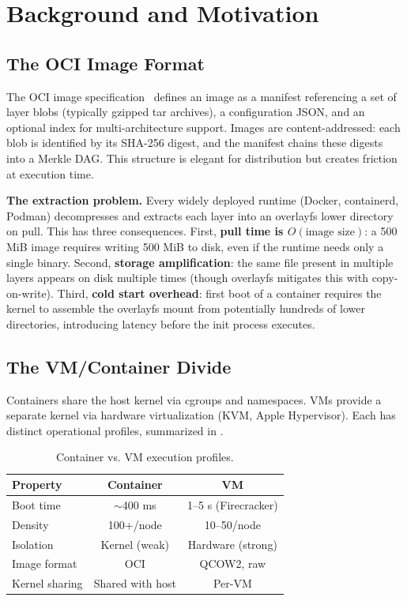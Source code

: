 \documentclass[11pt,a4paper]{article}
\begin{document}
\section{Background and Motivation}\label{sec:background}

\subsection{The OCI Image Format}

The OCI image specification~\cite{oci-spec} defines an image as a manifest referencing a set of layer blobs (typically gzipped tar archives), a configuration JSON, and an optional index for multi-architecture support. Images are content-addressed: each blob is identified by its SHA-256 digest, and the manifest chains these digests into a Merkle DAG. This structure is elegant for distribution but creates friction at execution time.

\textbf{The extraction problem.} Every widely deployed runtime (Docker, containerd, Podman) decompresses and extracts each layer into an overlayfs lower directory on pull. This has three consequences. First, \textbf{pull time is $O(\text{image size})$}: a 500 MiB image requires writing 500 MiB to disk, even if the runtime needs only a single binary. Second, \textbf{storage amplification}: the same file present in multiple layers appears on disk multiple times (though overlayfs mitigates this with copy-on-write). Third, \textbf{cold start overhead}: first boot of a container requires the kernel to assemble the overlayfs mount from potentially hundreds of lower directories, introducing latency before the init process executes.

\subsection{The VM/Container Divide}

Containers share the host kernel via cgroups and namespaces. VMs provide a separate kernel via hardware virtualization (KVM, Apple Hypervisor). Each has distinct operational profiles, summarized in .

\begin{table}[htbp]
    \centering
    \caption{Container vs. VM execution profiles.}
    \label{tab:container-vs-vm}
    \begin{tabular}{@{}lcc@{}}
        \toprule
        \textbf{Property} & \textbf{Container} & \textbf{VM} \\
        \midrule
        Boot time & $\sim$400 ms & 1--5 s (Firecracker) \\
        Density & 100+/node & 10--50/node \\
        Isolation & Kernel (weak) & Hardware (strong) \\
        Image format & OCI & QCOW2, raw \\
        Kernel sharing & Shared with host & Per-VM \\
        \bottomrule
    \end{tabular}
\end{table}
\end{document}
